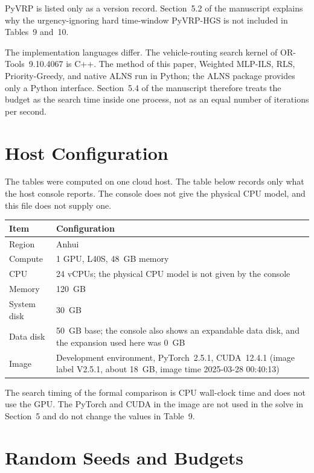 \documentclass[11pt,a4paper]{article}
\begin{document}
PyVRP is listed only as a version record. Section~5.2 of the manuscript explains why the urgency-ignoring hard time-window PyVRP-HGS is not included in Tables~9 and~10.

The implementation languages differ. The vehicle-routing search kernel of OR-Tools~9.10.4067 is C++. The method of this paper, Weighted MLP-ILS, RLS, Priority-Greedy, and native ALNS run in Python; the ALNS package provides only a Python interface. Section~5.4 of the manuscript therefore treats the budget as the search time inside one process, not as an equal number of iterations per second.

\section{Host Configuration}

The tables were computed on one cloud host. The table below records only what the host console reports. The console does not give the physical CPU model, and this file does not supply one.

\begin{center}
\begin{tabular}{lp{10.5cm}}
\toprule
Item & Configuration \\
\midrule
Region & Anhui \\
Compute & 1 GPU, L40S, 48~GB memory \\
CPU & 24 vCPUs; the physical CPU model is not given by the console \\
Memory & 120~GB \\
System disk & 30~GB \\
Data disk & 50~GB base; the console also shows an expandable data disk, and the expansion used here was 0~GB \\
Image & Development environment, PyTorch~2.5.1, CUDA~12.4.1 (image label V2.5.1, about 18~GB, image time 2025-03-28 00:40:13) \\
\bottomrule
\end{tabular}
\end{center}

The search timing of the formal comparison is CPU wall-clock time and does not use the GPU. The PyTorch and CUDA in the image are not used in the solve in Section~5 and do not change the values in Table~9.

\section{Random Seeds and Budgets}
\end{document}
